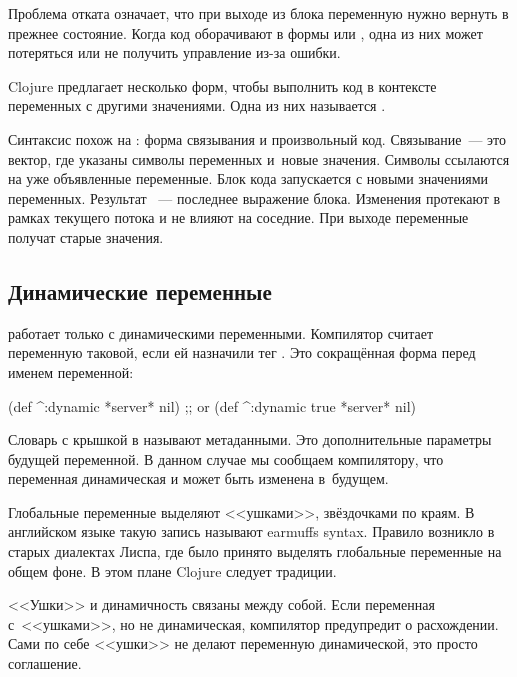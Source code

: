 Проблема отката означает, что при выходе из блока переменную нужно вернуть в прежнее
состояние. Когда код оборачивают в формы  или , одна
из них может потеряться или не получить управление из-за ошибки.

Clojure предлагает несколько форм, чтобы выполнить код в контексте переменных с
другими значениями. Одна из них называется  .


Синтаксис  похож на : форма связывания и произвольный
код. Связывание~--- это вектор, где указаны символы переменных и~новые
значения. Символы ссылаются на уже объявленные переменные. Блок кода запускается
с новыми значениями переменных. Результат ~--- последнее выражение
блока. Изменения  протекают в рамках текущего потока и не влияют
на соседние. При выходе переменные получат старые значения.

\subsection{Динамические переменные}

\label{dynamic-vars}


 работает только с динамическими переменными. Компилятор считает
переменную таковой, если ей назначили тег . Это сокращённая
форма  перед именем переменной:

\begin{clojure}
(def ^:dynamic *server* nil)
;; or
(def ^{:dynamic true} *server* nil)
\end{clojure}

Словарь с крышкой в  называют метаданными. Это дополнительные
параметры будущей переменной. В данном случае мы сообщаем компилятору, что
переменная динамическая и может быть изменена в~будущем.

Глобальные переменные выделяют <<ушками>>, звёздочками по краям. В английском
языке такую запись называют earmuffs syntax. Правило возникло в старых диалектах
Лиспа, где было принято выделять глобальные переменные на общем фоне. В этом
плане Clojure следует традиции.


<<Ушки>> и динамичность связаны между собой. Если переменная с~<<ушками>>, но не
динамическая, компилятор предупредит о расхождении. Сами по себе <<ушки>> не
делают переменную динамической, это просто соглашение.

